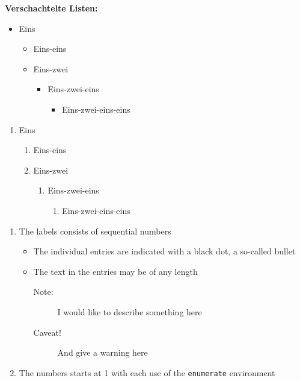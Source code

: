 \documentclass[a5paper]{article}
\begin{document}
\textbf{Verschachtelte Listen:}

\begin{itemize}
  \item Eins
  \begin{itemize}
  \item Eins-eins
  \item Eins-zwei
  \begin{itemize}
    \item Eins-zwei-eins
    \begin{itemize}
      \item Eins-zwei-eins-eins
    \end{itemize}
  \end{itemize}
  \end{itemize}
\end{itemize}


\begin{enumerate}
  \item Eins
  \begin{enumerate}
  \item Eins-eins
  \item Eins-zwei
  \begin{enumerate}
    \item Eins-zwei-eins
    \begin{enumerate}
      \item Eins-zwei-eins-eins
    \end{enumerate}
  \end{enumerate}
  \end{enumerate}
\end{enumerate}



\begin{enumerate}
   \item The labels consists of sequential numbers
   \begin{itemize}
     \item The individual entries are indicated with a black dot, a so-called bullet
     \item The text in the entries may be of any length
     \begin{description}
     \item[Note:] I would like to describe something here
     \item[Caveat!] And give a warning here
     \end{description}
   \end{itemize}
   \item The numbers starts at 1 with each use of the \texttt{enumerate} environment
\end{enumerate}
\end{document}
